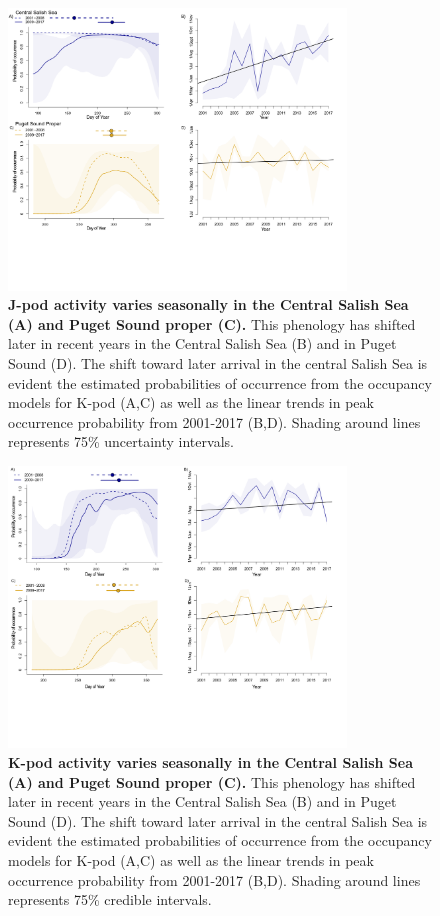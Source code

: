 \documentclass{article}
\begin{document}
\begin{figure}[ht]
\includegraphics[width=0.8\textwidth]{../analyses/figures/proboccJ_4panels.png} 
\caption{\textbf{J-pod activity varies seasonally in the Central Salish Sea (A) and Puget Sound proper (C).} This phenology has shifted later in recent years in the Central Salish Sea (B) and in Puget Sound (D). The shift toward later arrival in the central Salish Sea is evident the estimated probabilities of occurrence from the occupancy models for K-pod (A,C) as well as the linear trends in peak occurrence probability from 2001-2017 (B,D). Shading around lines represents 75\% uncertainty intervals. 
}
\label{fig:Jprobs}
\end{figure}

\begin{figure}[ht]
\includegraphics[width=0.8\textwidth]{../analyses/figures/proboccK_4panels.png} 
\caption{\textbf{K-pod activity varies seasonally in the Central Salish Sea (A) and Puget Sound proper (C).} This phenology has shifted later in recent years in the Central Salish Sea (B) and in Puget Sound (D). The shift toward later arrival in the central Salish Sea is evident the estimated probabilities of occurrence from the occupancy models for K-pod (A,C) as well as the linear trends in peak occurrence probability from 2001-2017 (B,D). Shading around lines represents 75\% credible intervals. 
}
\label{fig:Kprobs}
\end{figure}
\end{document}
